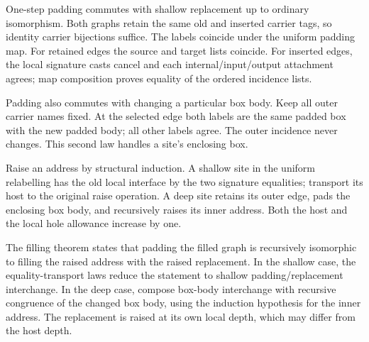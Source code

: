 




One-step padding commutes with shallow replacement up to ordinary isomorphism.
Both graphs retain the same old and inserted carrier tags, so identity carrier
bijections suffice. The labels coincide under the uniform padding map. For
retained edges the source and target lists coincide. For inserted edges, the
local signature casts cancel and each internal/input/output attachment agrees;
map composition proves equality of the ordered incidence lists.

Padding also commutes with changing a particular box body. Keep all outer
carrier names fixed. At the selected edge both labels are the same padded box
with the new padded body; all other labels agree. The outer incidence never
changes. This second law handles a site's enclosing box.




Raise an address by structural induction. A shallow site in the uniform
relabelling has the old local interface by the two signature equalities;
transport its host to the original raise operation. A deep site retains its
outer edge, pads the enclosing box body, and recursively raises its inner
address. Both the host and the local hole allowance increase by one.

The filling theorem states that padding the filled graph is recursively
isomorphic to filling the raised address with the raised replacement. In the
shallow case, the equality-transport laws reduce the statement to shallow
padding/replacement interchange. In the deep case, compose box-body interchange
with recursive congruence of the changed box body, using the induction
hypothesis for the inner address. The replacement is raised at its own local
depth, which may differ from the host depth.




